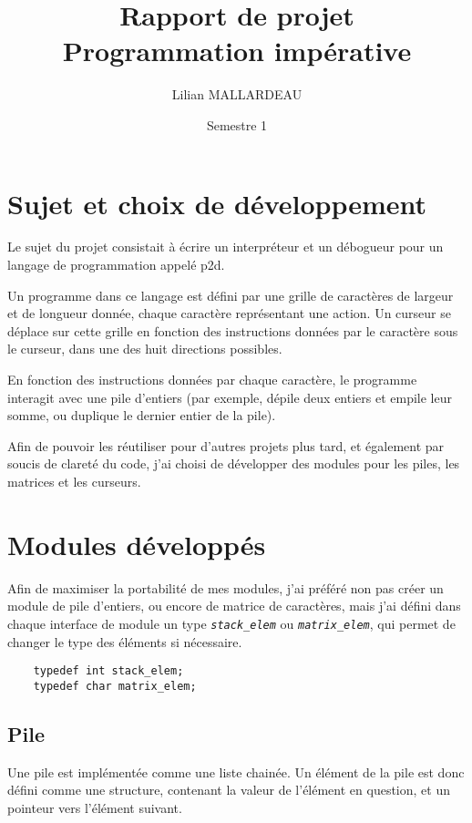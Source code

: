 \documentclass[a4paper,11pt]{article}
\title{Rapport de projet\\Programmation impérative}
\author{Lilian MALLARDEAU}
\date{Semestre 1}
\newcommand{\code}[1]{{\itshape\lstinline{#1}}}
\begin{document}
\maketitle
\tableofcontents
\break

\section*{Sujet et choix de développement}

Le sujet du projet consistait à écrire un interpréteur et un débogueur pour un langage de programmation appelé p2d.

Un programme dans ce langage est défini par une grille de caractères de largeur et de longueur donnée, chaque caractère représentant une action.
Un curseur se déplace sur cette grille en fonction des instructions données par le caractère sous le curseur, dans une des huit directions possibles.

En fonction des instructions données par chaque caractère, le programme interagit avec une pile d'entiers (par exemple, dépile deux entiers et empile leur somme, ou duplique le dernier entier de la pile).

\bigskip

Afin de pouvoir les réutiliser pour d'autres projets plus tard, et également par soucis de clareté du code, j'ai choisi de développer des modules pour les piles, les matrices et les curseurs.


\section*{Modules développés}
Afin de maximiser la portabilité de mes modules, j'ai préféré non pas créer un module de pile d'entiers, ou encore de matrice de caractères, mais j'ai défini dans chaque interface de module un type \code{stack_elem} ou \code{matrix_elem}, qui permet de changer le type des éléments si nécessaire.

\begin{lstlisting}
    typedef int stack_elem;
    typedef char matrix_elem;
\end{lstlisting}

\subsection*{Pile}
Une pile est implémentée comme une liste chainée. Un élément de la pile est donc défini comme une structure, contenant la valeur de l'élément en question, et un pointeur vers l'élément suivant.
\end{document}
